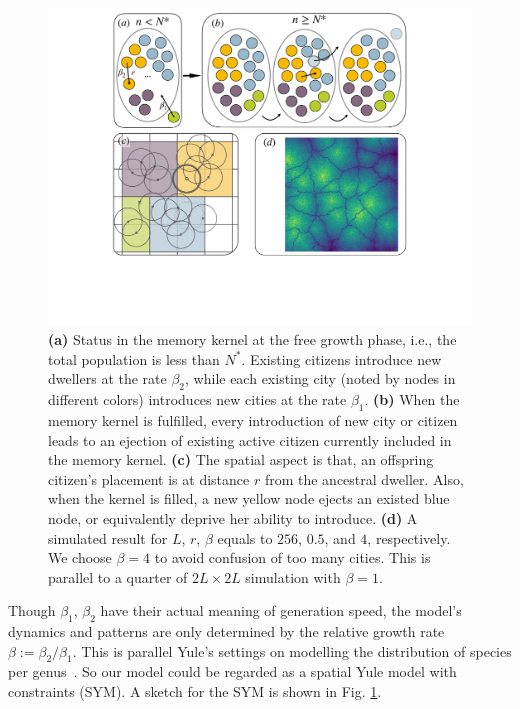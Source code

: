 \documentclass[reprint,unsortedaddress,amsmath,amssymb,aps,prl,showkeys]{revtex4-2}
\begin{document}
\begin{figure}
	\centering
	\includegraphics[width = 0.95\linewidth]{pics/sketchgood.pdf}
	\caption{\textbf{(a)} Status in the memory kernel at the free growth phase, i.e., the total population is less than $N^*$. Existing citizens introduce new dwellers at the rate $\beta_2$, while each existing city (noted by nodes in different colors) introduces new cities at the rate $\beta_1$. \textbf{(b)} When the memory kernel is fulfilled, every introduction of new city or citizen leads to an ejection of existing active citizen currently included in the memory kernel. \textbf{(c)} The spatial aspect is that, an offspring citizen's placement is at distance $r$ from the ancestral dweller. Also, when the kernel is filled, a new yellow node ejects an existed blue node, or equivalently deprive her ability to introduce. \textbf{(d)} A simulated result for $L$, $r$, $\beta$ equals to $256$, $0.5$, and $4$, respectively. We choose $\beta = 4$ to avoid confusion of too many cities. This is parallel to a quarter of $2L\times 2L$ simulation with $\beta = 1$.}
	\label{sketchpic}
\end{figure}

Though $\beta_1$, $\beta_2$ have their actual meaning of generation speed, the model's dynamics and patterns are only determined by the relative growth rate $\beta:= \beta_2/\beta_1$. This is parallel Yule's settings on modelling the distribution of species per genus~\cite{yule1925ii}.
So our model could be regarded as a spatial Yule model with constraints (SYM). A sketch for the SYM is shown in Fig. \ref{sketchpic}.
\end{document}
